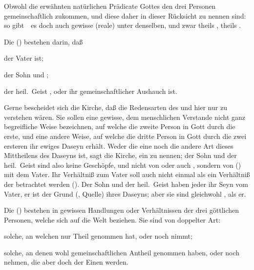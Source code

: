 \begin{aufza}
\item Obwohl die erwähnten natürlichen Prädicate Gottes den drei Personen gemeinschaftlich zukommen, und diese daher in dieser Rücksicht  zu nennen sind: so gibt~\ es doch auch gewisse  (reale)  unter denselben, und zwar theils , theils .
\item Die  () bestehen darin, daß
\begin{aufzb}
\item der Vater  ist;
\item der Sohn  und ;
\item der heil.\ Geist , oder ihr gemeinschaftlicher Aushauch ist.
\end{aufzb}
\item Gerne bescheidet sich die Kirche, daß die Redensarten des  und  hier nur  zu verstehen wären. Sie sollen eine gewisse, dem menschlichen Verstande nicht ganz begreifliche Weise bezeichnen, auf welche die zweite Person in Gott durch die erste, und eine andere Weise, auf welche die dritte Person in Gott durch die zwei ersteren ihr ewiges Daseyn erhält. Weder die eine noch die andere Art dieses Mittheilens des Daseyns ist, sagt die Kirche, ein  zu nennen; der Sohn und der heil.\ Geist sind also keine Geschöpfe, und nicht von  oder auch , sondern von  () mit dem Vater. Ihr Verhältniß zum Vater soll auch nicht einmal als ein Verhältniß der  betrachtet werden (). Der Sohn und der heil.\ Geist haben jeder ihr Seyn vom Vater, er ist der Grund (, Quelle) ihres Daseyns; aber sie sind gleichwohl , als er.
\item Die  () bestehen in gewissen Handlungen oder Verhältnissen der drei göttlichen Personen, welche sich auf die Welt beziehen. Sie sind von doppelter Art:
\begin{aufzb}
\item solche, an welchen nur  Theil genommen hat, oder noch nimmt;
\item solche, an denen wohl  gemeinschaftlichen Antheil genommen haben, oder noch nehmen, die aber doch der Einen  werden.~

\end{aufzb}
\end{aufza}
